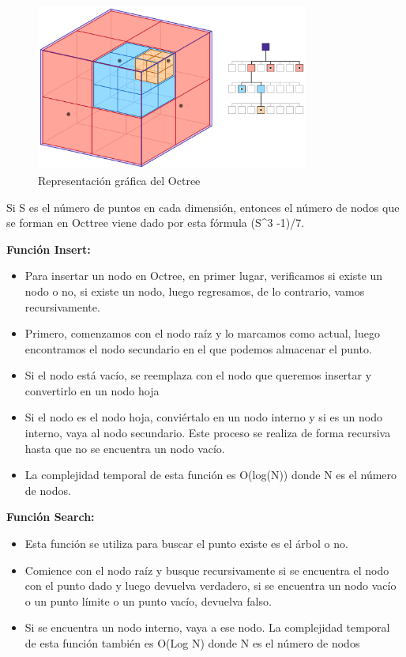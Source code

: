 \documentclass{article}
\begin{document}
\begin{figure}[htbp]
              \centering
              \includegraphics[width=0.8\textwidth]{img/octree.png}
              \caption{Representación gráfica del Octree}
              \label{fig:octree}
            \end{figure}

Si S es el número de puntos en cada dimensión, entonces el número de nodos que se forman en Octtree viene dado por esta fórmula (S^{3} -1)/7.

\textbf{Función Insert:}
\begin{itemize}
\item Para insertar un nodo en Octree, en primer lugar, verificamos si existe un nodo o no, si existe un nodo, luego regresamos, de lo contrario, vamos recursivamente.
\item Primero, comenzamos con el nodo raíz y lo marcamos como actual, luego encontramos el nodo secundario en el que podemos almacenar el punto.
\item Si el nodo está vacío, se reemplaza con el nodo que queremos insertar y convertirlo en un nodo hoja
\item Si el nodo es el nodo hoja, conviértalo en un nodo interno y si es un nodo interno, vaya al nodo secundario. Este proceso se realiza de forma recursiva hasta que no se encuentra un nodo vacío.
\item La complejidad temporal de esta función es O(log(N)) donde N es el número de nodos.
\end{itemize}

\textbf{Función Search:}
\begin{itemize}
\item Esta función se utiliza para buscar el punto existe es el árbol o no.
\item Comience con el nodo raíz y busque recursivamente si se encuentra el nodo con el punto dado y luego devuelva verdadero, si se encuentra un nodo vacío o un punto límite o un punto vacío, devuelva falso.
\item Si se encuentra un nodo interno, vaya a ese nodo. La complejidad temporal de esta función también es O(Log N) donde N es el número de nodos
\end{itemize}
\end{document}
